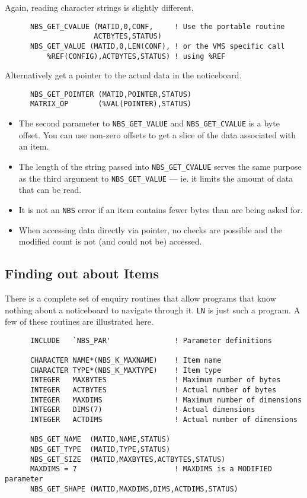 Again, reading character strings is slightly different,

\begin {verbatim}
      NBS_GET_CVALUE (MATID,0,CONF,     ! Use the portable routine
                     ACTBYTES,STATUS)
      NBS_GET_VALUE (MATID,0,LEN(CONF), ! or the VMS specific call
\end{verbatim}

Alternatively get a pointer to the actual data in the noticeboard.

\begin {verbatim}
      NBS_GET_POINTER (MATID,POINTER,STATUS)
      MATRIX_OP       (%
\end{verbatim}

\begin {itemize}
\item The second parameter to {\tt NBS\_GET\_VALUE} and {\tt NBS\_GET\_CVALUE} 
is a byte offset. You can use non-zero offsets to get a slice of the 
data associated with an item.
\item The length of the string passed into {\tt NBS\_GET\_CVALUE} serves 
the same purpose as the third argument to {\tt NBS\_GET\_VALUE} --- ie. it
limits the amount of data that can be read. 
\item It is not an {\tt NBS} error if an item contains fewer bytes than are
being asked for.
\item When accessing data directly via pointer, no checks are possible and the
modified count is not (and could not be) accessed.
\end {itemize}

\subsection {Finding out about Items}

There is a complete set of enquiry routines that allow programs that know
nothing about a noticeboard to navigate through it. {\tt LN} is just such a
program. A few of these routines are illustrated here.

\begin {verbatim}
      INCLUDE   `NBS_PAR'               ! Parameter definitions

      CHARACTER NAME*(NBS_K_MAXNAME)    ! Item name
      CHARACTER TYPE*(NBS_K_MAXTYPE)    ! Item type
      INTEGER   MAXBYTES                ! Maximum number of bytes
      INTEGER   ACTBYTES                ! Actual number of bytes
      INTEGER   MAXDIMS                 ! Maximum number of dimensions
      INTEGER   DIMS(7)                 ! Actual dimensions
      INTEGER   ACTDIMS                 ! Actual number of dimensions

      NBS_GET_NAME  (MATID,NAME,STATUS)
      NBS_GET_TYPE  (MATID,TYPE,STATUS)
      NBS_GET_SIZE  (MATID,MAXBYTES,ACTBYTES,STATUS)
      MAXDIMS = 7                       ! MAXDIMS is a MODIFIED parameter
      NBS_GET_SHAPE (MATID,MAXDIMS,DIMS,ACTDIMS,STATUS)
\end{verbatim}

